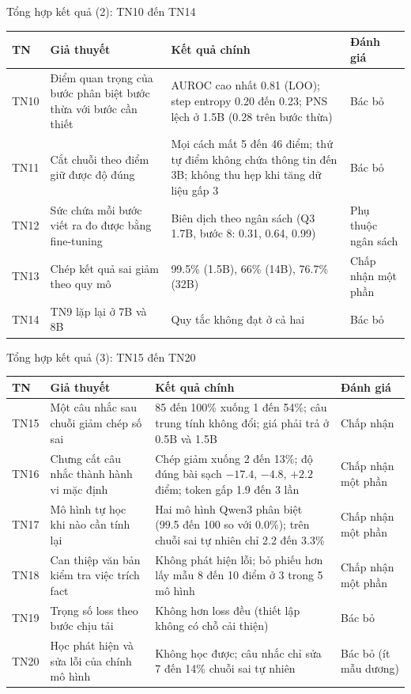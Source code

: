 \documentclass[aspectratio=169,t,10pt]{beamer}
\begin{document}
\begin{frame}[shrink]{Tổng hợp kết quả (2): TN10 đến TN14}
\footnotesize
\renewcommand{\arraystretch}{1.18}
\begin{tabularx}{\textwidth}{@{}P{0.9cm}YP{4.8cm}P{1.6cm}@{}}
\toprule
\textbf{TN} & \textbf{Giả thuyết} & \textbf{Kết quả chính} & \textbf{Đánh giá}\\
\midrule
TN10 & Điểm quan trọng của bước phân biệt bước thừa với bước cần thiết & AUROC cao nhất 0.81 (LOO); step entropy 0.20 đến 0.23; PNS lệch ở 1.5B (0.28 trên bước thừa) & Bác bỏ\\
TN11 & Cắt chuỗi theo điểm giữ được độ đúng & Mọi cách mất 5 đến 46 điểm; thứ tự điểm không chứa thông tin đến 3B; không thu hẹp khi tăng dữ liệu gấp 3 & Bác bỏ\\
TN12 & Sức chứa mỗi bước viết ra đo được bằng fine-tuning & Biên dịch theo ngân sách (Q3 1.7B, bước 8: 0.31, 0.64, 0.99) & Phụ thuộc ngân sách\\
TN13 & Chép kết quả sai giảm theo quy mô & 99.5\% (1.5B), 66\% (14B), 76.7\% (32B) & Chấp nhận một phần\\
TN14 & TN9 lặp lại ở 7B và 8B & Quy tắc không đạt ở cả hai & Bác bỏ\\
\bottomrule
\end{tabularx}
\end{frame}

\begin{frame}[shrink]{Tổng hợp kết quả (3): TN15 đến TN20}
\footnotesize
\renewcommand{\arraystretch}{1.18}
\begin{tabularx}{\textwidth}{@{}P{0.9cm}YP{4.8cm}P{1.6cm}@{}}
\toprule
\textbf{TN} & \textbf{Giả thuyết} & \textbf{Kết quả chính} & \textbf{Đánh giá}\\
\midrule
TN15 & Một câu nhắc sau chuỗi giảm chép số sai & 85 đến 100\% xuống 1 đến 54\%; câu trung tính không đổi; giá phải trả ở 0.5B và 1.5B & Chấp nhận\\
TN16 & Chưng cất câu nhắc thành hành vi mặc định & Chép giảm xuống 2 đến 13\%; độ đúng bài sạch $-17.4$, $-4.8$, $+2.2$ điểm; token gấp 1.9 đến 3 lần & Chấp nhận một phần\\
TN17 & Mô hình tự học khi nào cần tính lại & Hai mô hình Qwen3 phân biệt (99.5 đến 100 so với 0.0\%); trên chuỗi sai tự nhiên chỉ 2.2 đến 3.3\% & Chấp nhận một phần\\
TN18 & Can thiệp văn bản kiểm tra việc trích fact & Không phát hiện lỗi; bỏ phiếu hơn lấy mẫu 8 đến 10 điểm ở 3 trong 5 mô hình & Chấp nhận một phần\\
TN19 & Trọng số loss theo bước chịu tải & Không hơn loss đều (thiết lập không có chỗ cải thiện) & Bác bỏ\\
TN20 & Học phát hiện và sửa lỗi của chính mô hình & Không học được; câu nhắc chỉ sửa 7 đến 14\% chuỗi sai tự nhiên & Bác bỏ (ít mẫu dương)\\
\bottomrule
\end{tabularx}
\end{frame}
\end{document}
